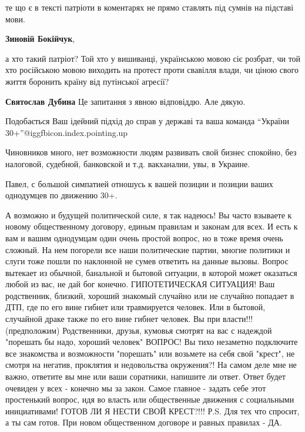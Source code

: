 \begin{itemize}
\begin{itemize}
те що є в тексті патріоти в коментарях не прямо ставлять під сумнів на підставі
мови.

\textbf{Зиновій Бокійчук}, 

а хто такий патріот? Той хто у вишиванці, українською мовою сіє розбрат, чи той
хто російською мовою виходить на протест проти свавілля влади, чи ціною свого
життя боронить країну від путінської агресії?

\textbf{Святослав Дубина} Це запитання з явною відповіддю. Але дякую.
\end{itemize} %


Подобається Ваш ідейний підхід до справ у державі та ваша команда
\enquote{України 30+}@igg{fbicon.index.pointing.up}


Чиновников много, нет возможности людям развивать свой бизнес спокойно, без
налоговой, судебной, банковской и т.д. вакханалии, увы, в Украине.


Павел, с большой симпатией отношусь к вашей позиции и позиции ваших однодумцев по движению 30+.

А возможно и будущей политической силе, я так надеюсь!
Вы часто взываете к новому общественному договору, единым правилам и законам для всех.
И есть к вам и вашим однодумцам один очень простой вопрос, но в тоже время очень сложный.
На нем погорели все наши политические партии, многие политики и слуги тоже пошли по наклонной не сумев ответить на данные вызовы.
Вопрос вытекает из обычной, банальной и бытовой ситуации, в которой может оказаться любой из вас, не дай бог конечно.
ГИПОТЕТИЧЕСКАЯ СИТУАЦИЯ!
Ваш родственник, близкий, хороший знакомый случайно или не случайно попадает в ДТП, где по его вине гибнет или травмируется человек.
Или в бытовой, случайной драке также по его вине гибнет человек.
Вы при власти!!! (предположим)
Родственники, друзья, кумовья смотрят на вас с надеждой "порешать бы надо, хороший человек"
ВОПРОС!
Вы тихо незаметно подключите все знакомства и возможности "порешать" или возьмете на себя свой "крест", не смотря на негатив, проклятия и недовольства окружения?!
На самом деле мне не важно, ответите вы мне или ваши соратники, напишите ли ответ. Ответ будет очевиден у всех - конечно мы за закон.
Самое главное - задать себе этот простенький вопрос, идя во власть или общественные движения с социальными инициативами!
ГОТОВ ЛИ Я НЕСТИ СВОЙ КРЕСТ?!!!
Р.S. Для тех что спросит, а ты сам готов.
При новом общественном договоре и равных правилах - ДА.


\end{itemize}

